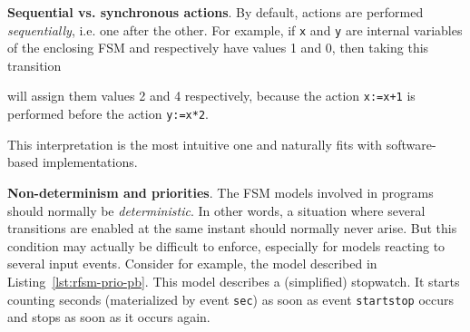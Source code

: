 \textbf{Sequential vs. synchronous actions}.
By default, actions are performed  \emph{sequentially}, i.e. one after the other. 
For example, if \verb|x| and \verb|y| are internal variables of the enclosing FSM and respectively
have values 1 and 0, then taking this transition

\begin{center}
\end{center}

will assign them values 2 and 4 respectively, because the action \verb|x:=x+1| is performed before
the action \verb|y:=x*2|. 

This interpretation is the most intuitive one and naturally fits with software-based
implementations.

\medskip
\textbf{Non-determinism and priorities}. 
The FSM models involved in programs should normally be \emph{deterministic}. In other words, a
situation where several transitions are enabled at the same instant should normally never arise. But
this condition may actually be difficult to enforce, especially for models reacting to several input
events. Consider for example, the model described in Listing~\ref{lst:rfsm-prio-pb}. This model
describes a (simplified) stopwatch. It starts counting seconds (materialized by event \verb|sec|)
as soon as event \verb|startstop| occurs and stops as soon as it occurs again.

